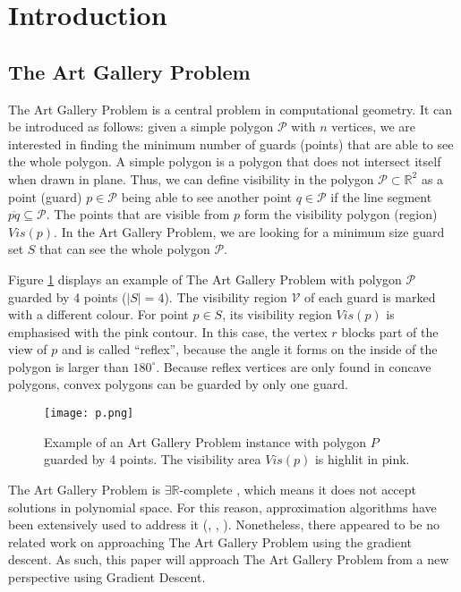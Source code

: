 \section{Introduction}
\subsection{The Art Gallery Problem \cite{o1987art}}

The Art Gallery Problem \cite{o1987art} is a central problem in computational geometry. It can be introduced as follows: given a simple polygon $\mathcal P$ with $n$ vertices, we are interested in finding the minimum number of guards (points) that are able to see the whole polygon. A simple polygon is a polygon that does not intersect itself when drawn in plane. Thus, we can define visibility in the polygon $\mathcal P \subset \mathbb R^2$ as a point (guard) $p \in \mathcal P$ being able to see another point $q \in \mathcal P$ if the line segment $\overline{pq} \subseteq \mathcal P$. The points that are visible from $p$ form the visibility polygon (region) $Vis(p)$. In the Art Gallery Problem, we are looking for a minimum size guard set $S$ that can see the whole polygon $\mathcal P$.

Figure \ref{fig:art} displays an example of The Art Gallery Problem \cite{o1987art} with polygon $\mathcal P$ guarded by 4 points ($|S| = 4$). The visibility region $\mathcal V$ of each guard is marked with a different colour. For point $p \in S$, its visibility region $Vis(p)$ is emphasised with the pink contour. In this case, the vertex $r$ blocks part of the view of $p$ and is called ``reflex'', because the angle it forms on the inside of the polygon is larger than $180^\circ$. Because reflex vertices are only found in concave polygons, convex polygons can be guarded by only one guard.

\begin{figure}[h!]
    \centering
    \texttt{[image: p.png]}
    \caption{Example of an Art Gallery Problem instance with polygon $P$ guarded by 4 points. The visibility area $Vis(p)$ is highlit in pink.}
    \label{fig:art}
\end{figure}

The Art Gallery Problem \cite{o1987art} is $\exists \mathbb R$-complete \cite{abrahamsen2021art}, which means it does not accept solutions in polynomial space. For this reason, approximation algorithms have been extensively used to address it (\cite{DBLP:journals/corr/BonnetM16b}, \cite{GHOSH2010718}, \cite{DBLP:journals/corr/abs-2007-06920}). Nonetheless, there appeared to be no related work on approaching The Art Gallery Problem \cite{o1987art} using the gradient descent. As such, this paper will approach The Art Gallery Problem \cite{o1987art} from a new perspective using Gradient Descent.

